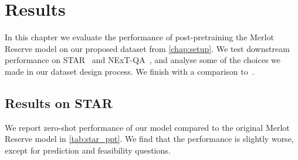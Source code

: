 \chapter{Results}
\label{chap:results}

In this chapter we evaluate the performance of post-pretraining the Merlot
Reserve model on our proposed dataset from \cref{chap:setup}. We test
downstream performance on STAR~\citep{wu2021star} and
NExT-QA~\citep{xiao2021nextqa}, and analyse some of the choices we made in our
dataset design process. We finish with a comparison
to~\citep{bagad2023testoftime}.

\section{Results on STAR}
\label{sec:star_results}

We report zero-shot performance of our model compared to the original Merlot Reserve
model in \cref{tab:star_ppt}. We find that the performance is slightly worse,
except for prediction and feasibility questions.

